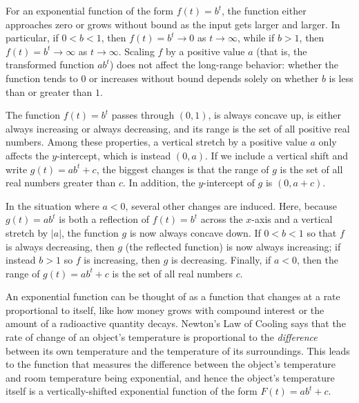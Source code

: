 \documentclass[nooutcomes]{ximera}
\begin{document}
\begin{summary}
\item For an exponential function of the form \(f(t) = b^t\), the function either approaches zero or grows without bound as the input gets larger and larger.  In particular, if \(0 \lt b \lt 1\), then \(f(t) = b^t \to 0\) as \(t \to \infty\), while if \(b \gt 1\), then \(f(t) = b^t \to \infty\) as \(t \to \infty\).  Scaling \(f\) by a positive value \(a\) (that is, the transformed function \(ab^t\)) does not affect the long-range behavior:  whether the function tends to \(0\) or increases without bound depends solely on whether \(b\) is less than or greater than \(1\).%
\item{}\hypertarget{p-1350}{}%
The function \(f(t) = b^t\) passes through \((0,1)\), is always concave up, is either always increasing or always decreasing, and its range is the set of all positive real numbers.  Among these properties, a vertical stretch by a positive value \(a\) only affects the \(y\)-intercept, which is instead \((0,a)\).  If we include a vertical shift and write \(g(t) = ab^t + c\), the biggest changes is that the range of \(g\) is the set of all real numbers greater than \(c\).  In addition, the \(y\)-intercept of \(g\) is \((0,a+c)\).
\item In the situation where \(a \lt 0\), several other changes are induced.  Here, because \(g(t) = ab^t\) is both a reflection of \(f(t) = b^t\) across the \(x\)-axis and a vertical stretch by \(|a|\), the function \(g\) is now always concave down.  If \(0 \lt b \lt 1\) so that \(f\) is always decreasing, then \(g\) (the reflected function) is now always increasing; if instead \(b \gt 1\) so \(f\) is increasing, then \(g\) is decreasing.  Finally, if \(a \lt 0\), then the range of \(g(t) = ab^t + c\) is the set of all real numbers \(c\).
\item An exponential function can be thought of as a function that changes at a rate proportional to itself, like how money grows with compound interest or the amount of a radioactive quantity decays.  Newton's Law of Cooling says that the rate of change of an object's temperature is proportional to the \emph{difference} between its own temperature and the temperature of its surroundings.  This leads to the function that measures the difference between the object's temperature and room temperature being exponential, and hence the object's temperature itself is a vertically-shifted exponential function of the form \(F(t) = ab^t + c\).
\end{summary}
\end{document}
